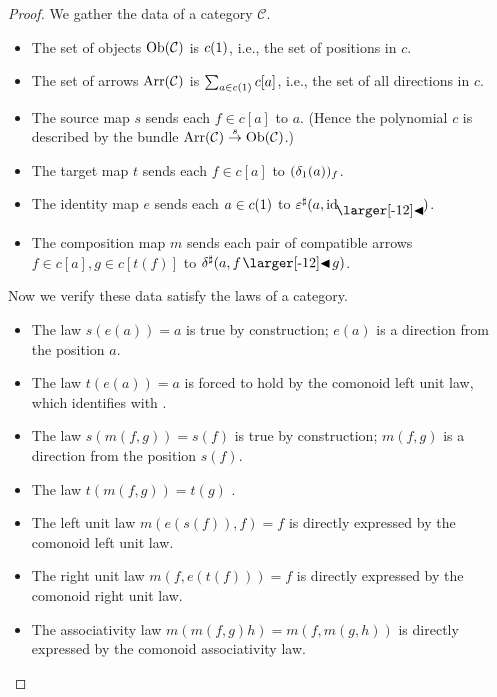 \documentclass{amsart}
\begin{document}
\begin{proof}
We gather the data of a category $\mathcal{C}$.
\begin{itemize}
\item The set of objects $\operatorname{Ob}(\mathcal{C})$ is $c(1)$, i.e., the set
  of positions in $c$.
\item The set of arrows $\operatorname{Arr}(\mathcal{C})$ is
  $\sum_{a \in c(1)}c[a]$, i.e., the set of all directions in $c$.
\item The source map $s$ sends each $f \in c[a]$ to $a$. (Hence the
  polynomial $c$ is described by the bundle
  $\operatorname{Arr}(\mathcal{C}) \overset{s}{\to} \operatorname{Ob}(\mathcal{C})$.)
\item The target map $t$ sends each $f \in c[a]$ to $(\delta_1(a))_f$.
\item The identity map $e$ sends each $a \in c(1)$ to
  $\varepsilon^\sharp(a, \idsubd)$.
\item The composition map $m$ sends each pair of compatible
  arrows ${f \in c[a]}, {g \in c[t(f)]}$ to $\delta^\sharp(a, f \subd g)$.
\end{itemize}

Now we verify these data satisfy the laws of a category.
\begin{itemize}
\item The law $s(e(a)) = a$ is true by construction; $e(a)$ is a
  direction from the position $a$.
\item The law $t(e(a)) = a$ is forced to hold by the comonoid left
  unit law, which identifies  with .
\item The law $s(m(f, g)) = s(f)$ is true by construction; $m(f, g)$
  is a direction from the position $s(f)$.
\item The law $t(m(f, g)) = t(g)$ .
\item The left unit law $m(e(s(f)), f) = f$ is directly expressed by
  the comonoid left unit law.
\item The right unit law $m(f, e(t(f))) = f$ is directly expressed by
  the comonoid right unit law.
\item The associativity law $m(m(f, g) h) = m(f, m(g, h))$ is directly
  expressed by the comonoid associativity law.
\end{itemize}

\begin{center}
\end{center}
\end{proof}
\end{document}
